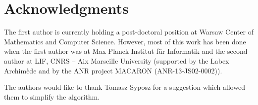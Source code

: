 \documentclass{article}[11pt,letter]
\begin{document}
\section*{Acknowledgments}

The first author is currently holding a post-doctoral position at Warsaw Center of Mathematics and Computer Science.
However, most of this work has been done when the first author was at Max-Planck-Institut f\"{u}r Informatik and
the second author at LIF, CNRS – Aix Marseille University (supported by the Labex Archimède and by the ANR project MACARON (ANR-13-JS02-0002)).

The authors would like to thank Tomasz Syposz for a suggestion which allowed them to simplify the algorithm.


\end{document}
